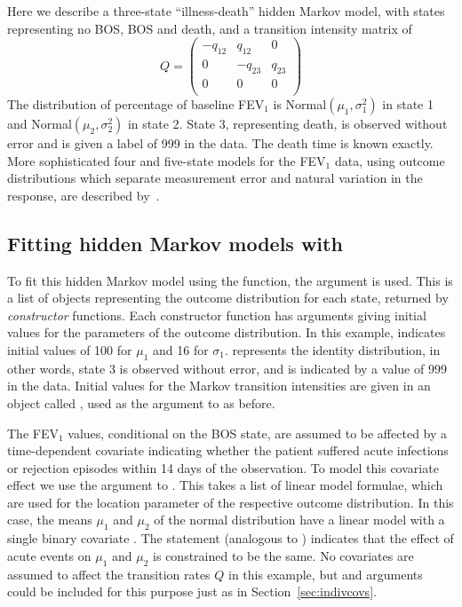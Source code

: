 \documentclass[article,shortnames]{jss}
\begin{document}
Here we describe a three-state ``illness-death'' hidden Markov model,
with states representing no BOS, BOS and death, and a transition
intensity matrix of
\[
Q = \left(
  \begin{array}{llll}
    -q_{12} & q_{12} &  0  \\
    0  & -q_{23} & q_{23}\\
    0    &   0    &   0   \\
  \end{array}
\right )
\]
The distribution of percentage of baseline FEV$_1$ is Normal$(\mu_1,
\sigma^2_1)$ in state 1 and Normal$(\mu_2, \sigma^2_2)$ in state 2.
State 3, representing death, is observed without error and is given a
label of 999 in the data. The death time is known exactly.  More
sophisticated four and five-state models for the FEV$_1$ data, using
outcome distributions which separate measurement error and natural
variation in the response, are described by~\citet{JacksonS02}.


\subsection[Fitting hidden Markov models with msm]{Fitting hidden Markov models with }
\label{sec:fittinghmm}

To fit this hidden Markov model using the  function, the
argument  is used.  This is a list of objects
representing the outcome distribution for each state, returned by
\emph{constructor} functions.  Each constructor function has arguments
giving initial values for the parameters of the outcome distribution.
In this example,  indicates initial
values of 100 for $\mu_1$ and 16 for $\sigma_1$.  
represents the identity distribution, in other words, state 3 is
observed without error, and is indicated by a value of 999 in the
data.  Initial values for the Markov transition intensities are given
in an object called , used as the 
argument to  as before.

The FEV$_1$ values, conditional on the BOS state, are assumed to be
affected by a time-dependent covariate indicating whether the patient
suffered acute infections or rejection episodes within 14 days of the
observation.  To model this covariate effect we use the\linebreak
{} argument to .  This takes a list of
linear model formulae, which are used for the location parameter of
the respective outcome distribution.  In this case, the means $\mu_1$
and $\mu_2$ of the normal distribution have a linear model with a
single binary covariate .  The 
statement (analogous to ) indicates that the effect
of acute events on $\mu_1$ and $\mu_2$ is constrained to be the same.
No covariates are assumed to affect the transition rates $Q$ in this
example, but  and  arguments could
be included for this purpose just as in Section~\ref{sec:indivcovs}.
\end{document}
